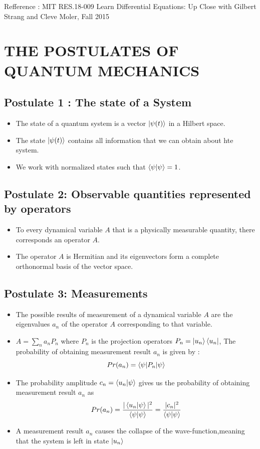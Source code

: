 \documentclass[12pt,oneside]{book}
\begin{document}
{\scriptsize{Refference : MIT RES.18-009 Learn Differential Equations: Up Close with Gilbert Strang and Cleve Moler, Fall 2015}}
\pagebreak
\section{THE POSTULATES OF QUANTUM MECHANICS}
\subsection{Postulate 1 : The state of a System}
\begin{itemize}
    \item The state of a quantum system is a vector $\ket{\psi(t)}$ in a Hilbert space.
    \item The state $\ket{\psi(t)}$ contains all information that we can obtain about hte system.
    \item We work with normalized states such that $\braket{\psi|\psi} =1$.
\end{itemize}
\subsection{Postulate 2: Observable quantities represented by operators}
\begin{itemize}
    \item To every dynamical variable $A$ that is a physically measurable quantity, there corresponds an operator $A$.
    \item The operator $A$ is Hermitian and its eigenvectors form a complete orthonormal basis of the vector space.
\end{itemize}
\subsection{Postulate 3: Measurements}
\begin{itemize}
    \item The possible results of measurement of a dynamical variable $A$ are the eigenvalues $a_n$ of the operator $A$ corresponding to that variable.
    \item $A = \sum_n a_n P_n$ where $P_n$ is the projection operators $P_n = \ket{u_n}\bra{u_n}$, The probability of obtaining measurement result $a_n$ is given by :
          \[ Pr(a_n) = \braket{\psi|P_n|\psi}  \]
    \item The probability amplitude $c_n = \braket{u_n|\psi}$ gives us the probability of obtaining measurement result $a_n$ as
          \[ Pr(a_n) = \frac{|\braket{u_n|\psi} |^2}{\braket{\psi|\psi}} = \frac{|c_n|^2}{\braket{\psi|\psi}} \]
    \item A measurement result $a_n$ causes the collapse of the wave-function,meaning that the system is left in state $\ket{u_n}$
\end{itemize}
\end{document}
